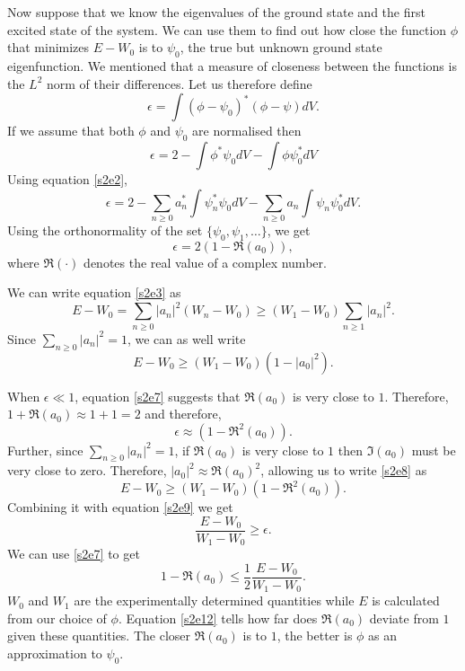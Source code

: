 \documentclass{article}
\numberwithin{equation}{section}
\begin{document}
Now suppose that we know the eigenvalues of the ground state and the first 
excited state of the system. We can use them to find out how close the 
function $\phi$ that minimizes $E - W_0$ is to $\psi_0$, the true but 
unknown ground state eigenfunction. We mentioned that a measure of 
closeness between the functions is the $L^2$ norm of their differences. 
Let us therefore define
\begin{equation}\label{s2e6}
\epsilon = \int (\phi - \psi_0)^\ast(\phi - \psi)dV.
\end{equation}
If we assume that both $\phi$ and $\psi_0$ are normalised then
\[
\epsilon = 2 - \int\phi^\ast\psi_0 dV - \int\phi\psi_0^\ast dV
\]
Using equation \eqref{s2e2},
\[
\epsilon = 2 - \sum_{n \ge 0}a_n^\ast\int\psi_n^\ast\psi_0 dV - \sum_{n \ge 0}a_n\int\psi_n\psi_0^\ast dV.
\]
Using the orthonormality of the set $\{\psi_0, \psi_1, \ldots\}$, we get
\begin{equation}\label{s2e7}
\epsilon = 2(1 - \Re(a_0)),
\end{equation}
where $\Re(\cdot)$ denotes the real value of a complex number. 

We can write equation \eqref{s2e3} as
\[
E - W_0 = \sum_{n \ge 0}|a_n|^2(W_n - W_0) \ge (W_1 - W_0)\sum_{n \ge 1}|a_n|^2.
\]
Since $\sum_{n \ge 0}|a_n|^2 = 1$, we can as well write
\begin{equation}\label{s2e8}
E - W_0 \ge (W_1 - W_0)(1 - |a_0|^2).
\end{equation}

When $\epsilon \ll 1$, equation \eqref{s2e7} suggests that $\Re(a_0)$ is very
close to $1$. Therefore, $1 + \Re(a_0) \approx 1 + 1 = 2$ and therefore,
\begin{equation}\label{s2e9}
\epsilon \approx (1 - \Re^2(a_0)).
\end{equation}
Further, since $\sum_{n \ge 0}|a_n|^2 = 1$, if $\Re(a_0)$ is very close to $1$
then $\Im(a_0)$ must be very close to zero. Therefore, $|a_0|^2 \approx
\Re(a_0)^2$, allowing us to write \eqref{s2e8} as
\begin{equation}\label{s2e10}
E - W_0 \ge (W_1 - W_0)(1 - \Re^2(a_0)).
\end{equation}
Combining it with equation \eqref{s2e9} we get
\begin{equation}\label{s2e11}
\frac{E - W_0}{W_1 - W_0} \ge \epsilon.
\end{equation}
We can use \eqref{s2e7} to get 
\begin{equation}\label{s2e12}
1 - \Re(a_0) \le \frac{1}{2}\frac{E - W_0}{W_1 - W_0}.
\end{equation}
$W_0$ and $W_1$ are the experimentally determined quantities while $E$ is
calculated from our choice of $\phi$. Equation \eqref{s2e12} tells how far
does $\Re(a_0)$ deviate from $1$ given these quantities. The closer $\Re(a_0)$
is to $1$, the better is $\phi$ as an approximation to $\psi_0$.
\end{document}
